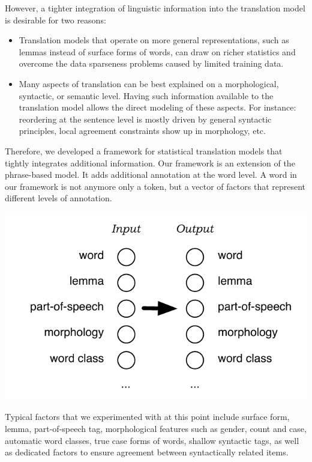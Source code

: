 \documentclass[10pt]{report}
\theoremstyle{plain}
\begin{document}
However, a tighter integration of linguistic information into the translation model is desirable for two reasons:
\begin{itemize}
\item Translation models that operate on more general representations, such as lemmas instead of surface forms of words, can draw on richer statistics and overcome the data sparseness problems caused by limited training data.
\item Many aspects of translation can be best explained on a morphological, syntactic, or semantic level. Having such information available to the translation model allows the direct modeling of these aspects. For instance: reordering at the sentence level is mostly driven by general syntactic principles, local agreement constraints show up in morphology, etc.
\end{itemize}

Therefore, we developed a framework for statistical translation models that tightly integrates additional information. Our framework is an extension of the phrase-based model. It adds additional annotation at the word level. A word in our framework is not anymore only a token, but a vector of factors that represent different levels of annotation.

\begin{center}
\includegraphics[scale=1]{factors.pdf}
\end{center}

Typical factors that we experimented with at this point include surface form, lemma, part-of-speech tag, morphological features such as gender, count and case, automatic word classes, true case forms of words, shallow syntactic tags, as well as dedicated factors to ensure agreement between syntactically related items. 
\end{document}
